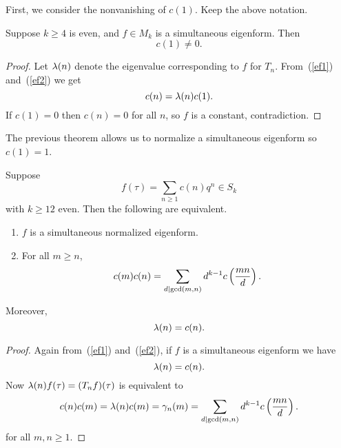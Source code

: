 First, we consider the nonvanishing of $c(1)$. Keep the above notation.
\begin{thm}[Apostol, 6.14]
Suppose $k\ge 4$ is even, and $f\in M_k$ is a simultaneous eigenform. Then
\[
c(1)\neq 0.
\]
\end{thm}
\begin{proof}
Let $\lambda(n)$ denote the eigenvalue corresponding to $f$ for $T_n$. 
From~(\ref{ef1}) and~(\ref{ef2}) we get
\[
c(n)=\lambda(n)c(1).
\]
If $c(1)=0$ then $c(n)=0$ for all $n$, so $f$ is a constant, contradiction.
\end{proof}

The previous theorem allows us to normalize a simultaneous eigenform so $c(1)=1$.
\begin{thm}\label{multthm}
Suppose 
\[f(\tau)=\sum_{n\ge 1} c(n)q^n\in S_k\]
with $k\ge 12$ even. Then the following are equivalent.
\begin{enumerate}
\item
$f$ is a simultaneous normalized eigenform.
\item For all $m\ge n$,
\[
c(m)c(n)=\sum_{d\mid \gcd(m,n)} d^{k-1} c\left( {\frac{mn}{d}} \right).
\]
\end{enumerate}
Moreover, \[\lambda(n)=c(n).\]
\end{thm}
\begin{proof}
Again from~(\ref{ef1}) and~(\ref{ef2}), if $f$ is a simultaneous eigenform we have
\[
\lambda(n)=c(n).
\]
Now $\lambda(n)f(\tau)=(T_nf)(\tau)$  is equivalent to
\[
c(n)c(m)=\lambda(n)c(m)=\gamma_n(m)=\sum_{d\mid\gcd(m,n)} d^{k-1} c\left( {\frac{mn}{d}} \right).
\]
for all $m,n\ge 1$.
\end{proof}
